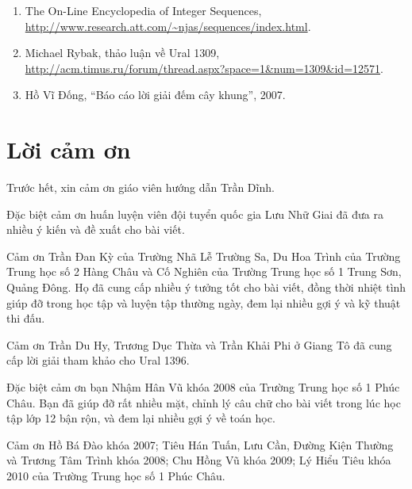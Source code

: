 \documentclass[11pt]{article}
\begin{document}
\begin{enumerate}
  \item The On-Line Encyclopedia of Integer Sequences,
  \url{http://www.research.att.com/~njas/sequences/index.html}.
  \item Michael Rybak, thảo luận về Ural 1309,
  \url{http://acm.timus.ru/forum/thread.aspx?space=1&num=1309&id=12571}.
  \item Hồ Vĩ Đống, ``Báo cáo lời giải đếm cây khung'', 2007.
\end{enumerate}

\section*{Lời cảm ơn}

Trước hết, xin cảm ơn giáo viên hướng dẫn Trần Dĩnh.

Đặc biệt cảm ơn huấn luyện viên đội tuyển quốc gia Lưu Nhữ Giai đã đưa ra
nhiều ý kiến và đề xuất cho bài viết.

Cảm ơn Trần Đan Kỳ của Trường Nhã Lễ Trường Sa, Du Hoa Trình của Trường Trung
học số 2 Hàng Châu và Cố Nghiên của Trường Trung học số 1 Trung Sơn, Quảng
Đông. Họ đã cung cấp nhiều ý tưởng tốt cho bài viết, đồng thời nhiệt tình giúp
đỡ trong học tập và luyện tập thường ngày, đem lại nhiều gợi ý và kỹ thuật thi
đấu.

Cảm ơn Trần Du Hy, Trương Dục Thừa và Trần Khải Phi ở Giang Tô đã cung cấp lời
giải tham khảo cho Ural 1396.

Đặc biệt cảm ơn bạn Nhậm Hân Vũ khóa 2008 của Trường Trung học số 1 Phúc Châu.
Bạn đã giúp đỡ rất nhiều mặt, chỉnh lý câu chữ cho bài viết trong lúc học tập
lớp 12 bận rộn, và đem lại nhiều gợi ý về toán học.

Cảm ơn Hồ Bá Đào khóa 2007; Tiêu Hán Tuấn, Lưu Cần, Đường Kiện Thường và
Trương Tâm Trình khóa 2008; Chu Hồng Vũ khóa 2009; Lý Hiểu Tiêu khóa 2010 của
Trường Trung học số 1 Phúc Châu.
\end{document}

